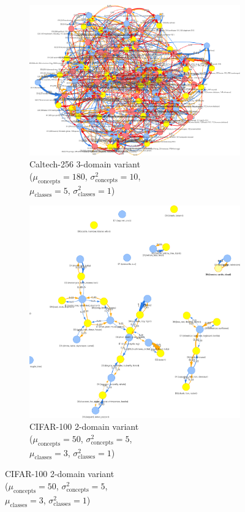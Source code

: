 \begin{figure}[H]
      \begin{subfigure}[b]{0.35\textwidth}
            \centering
            \includegraphics[width=\textwidth]{figures/caltech256_3domain.png}
            \caption{Caltech-256 3-domain variant\\
            ($\mu_{\text{concepts}}=180$, $\sigma^2_{\text{concepts}}=10$,\\
            $\mu_{\text{classes}}=5$, $\sigma^2_{\text{classes}}=1$)}
            \label{fig:caltech256_3domain}
      \end{subfigure}
      \hfill
      \begin{subfigure}[b]{0.35\textwidth}
            \centering
            \includegraphics[width=\textwidth]{figures/cifar100_2domain.png}
            \caption{CIFAR-100 2-domain variant\\
            ($\mu_{\text{concepts}}=50$, $\sigma^2_{\text{concepts}}=5$,\\
            $\mu_{\text{classes}}=3$, $\sigma^2_{\text{classes}}=1$)}
            \label{fig:cifar100_2domain}
      \end{subfigure}


\end{figure}
